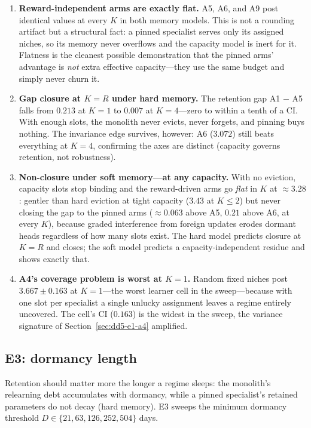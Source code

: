 \documentclass[11pt,a4paper]{article}
\theoremstyle{definition}
\theoremstyle{plain}
\begin{document}
\begin{enumerate}
\item \textbf{Reward-independent arms are exactly flat.} A5, A6, and A9 post
identical values at every $K$ in both memory models. This is not a rounding
artifact but a structural fact: a pinned specialist serves only its assigned
niches, so its memory never overflows and the capacity model is inert for
it. Flatness is the cleanest possible demonstration that the pinned arms'
advantage is \emph{not} extra effective capacity---they use the same budget
and simply never churn it.
\item \textbf{Gap closure at $K = R$ under hard memory.} The retention gap
A1 $-$ A5 falls from $0.213$ at $K=1$ to $0.007$ at $K=4$---zero to within
a tenth of a CI. With enough slots, the monolith never evicts, never
forgets, and pinning buys nothing. The invariance edge survives, however:
A6 ($3.072$) still beats everything at $K=4$, confirming the axes are
distinct (capacity governs retention, not robustness).
\item \textbf{Non-closure under soft memory---at any capacity.} With no
eviction, capacity slots stop binding and the reward-driven arms go
\emph{flat} in $K$ at $\approx 3.28$: gentler than hard eviction at tight
capacity ($3.43$ at $K \le 2$) but never closing the gap to the pinned
arms ($\approx 0.063$ above A5, $0.21$ above A6, at every $K$), because
graded interference from foreign updates erodes dormant heads regardless
of how many slots exist. The hard model predicts closure at $K = R$ and
closes; the soft model predicts a capacity-independent residue and shows
exactly that.
\item \textbf{A4's coverage problem is worst at $K=1$.} Random fixed niches
post $3.667 \pm 0.163$ at $K=1$---the worst learner cell in the
sweep---because with one slot per specialist a single unlucky assignment
leaves a regime entirely uncovered. The cell's CI ($0.163$) is the widest in
the sweep, the variance signature of Section~\ref{sec:dd5-e1-a4} amplified.
\end{enumerate}

\subsection{E3: dormancy length}
\label{sec:dd5-e3}

Retention should matter more the longer a regime sleeps: the monolith's
relearning debt accumulates with dormancy, while a pinned specialist's
retained parameters do not decay (hard memory). E3 sweeps the minimum
dormancy threshold $D \in \{21, 63, 126, 252, 504\}$ days.
\end{document}
